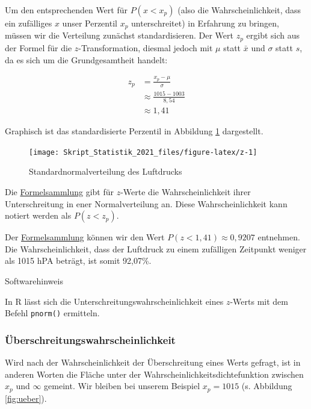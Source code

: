 \documentclass[
  11pt,
  ngerman,
  a4paper,
]{report}
\begin{document}
Um den entsprechenden Wert für \(P(x < x_p)\) (also die Wahrscheinlichkeit, dass ein zufälliges \(x\) unser Perzentil \(x_p\) unterschreitet) in Erfahrung zu bringen, müssen wir die Verteilung zunächst standardisieren. Der Wert \(z_p\) ergibt sich aus der Formel für die \(z\)-Transformation, diesmal jedoch mit \(\mu\) statt \(\bar{x}\) und \(\sigma\) statt \(s\), da es sich um die Grundgesamtheit handelt:

\[\begin{aligned}
    z_p &= \frac{x_p-\mu}{\sigma} \\[4pt]
        &\approx \frac{1015-1003}{8{,}54}\\[4pt]
        &\approx 1{,}41
  \end{aligned}
\]

Graphisch ist das standardisierte Perzentil in Abbildung \ref{fig:z} dargestellt.

\begin{figure}[H]

{\centering \texttt{[image: Skript\_Statistik\_2021\_files/figure-latex/z-1]} 

}

\caption{Standardnormalverteilung des Luftdrucks}\label{fig:z}
\end{figure}

Die \href{Formelsammlung\%20und\%20Wertetabellen.pdf}{Formelsammlung} gibt für \(z\)-Werte die Wahrscheinlichkeit ihrer Unterschreitung in ener Normalverteilung an. Diese Wahrscheinlichkeit kann notiert werden als \(P(z<z_p)\).

Der \href{Formelsammlung\%20und\%20Wertetabellen.pdf}{Formelsammlung} können wir den Wert \(P(z < 1,41) \approx 0,9207\) entnehmen. Die Wahrscheinlichkeit, dass der Luftdruck zu einem zufälligen Zeitpunkt weniger als 1015 hPA beträgt, ist somit 92,07\%.

Softwarehinweis

In R lässt sich die Unterschreitungswahrscheinlichkeit eines \(z\)-Werts mit dem Befehl \texttt{pnorm()} ermitteln.

\hypertarget{uxfcberschreitungswahrscheinlichkeit}{%
\subsubsection{Überschreitungswahrscheinlichkeit}\label{uxfcberschreitungswahrscheinlichkeit}}

Wird nach der Wahrscheinlichkeit der Überschreitung eines Werts gefragt, ist in anderen Worten die Fläche unter der Wahrscheinlichkeitsdichtefunktion zwischen \(x_p\) und \(\infty\) gemeint. Wir bleiben bei unserem Beispiel \(x_p=1015\) (s. Abbildung \ref{fig:ueber}).
\end{document}
